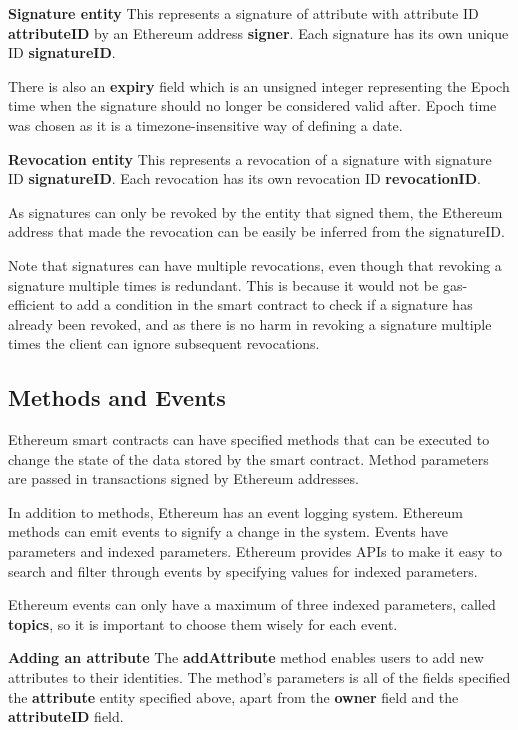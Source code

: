 \documentclass[12pt,a4paper]{report}
\begin{document}
	\bigskip
	\noindent \textbf{Signature entity}\newline
	This represents a signature of attribute with attribute ID \textbf{attributeID} by an Ethereum address \textbf{signer}. Each signature has its own unique ID \textbf{signatureID}.
	
	There is also an \textbf{expiry} field which is an unsigned integer representing the Epoch time when the signature should no longer be considered valid after. Epoch time was chosen as it is a timezone-insensitive way of defining a date.
	
	\bigskip
	\noindent \textbf{Revocation entity}\newline
	This represents a revocation of a signature with signature ID \textbf{signatureID}. Each revocation has its own revocation ID \textbf{revocationID}.
	
	As signatures can only be revoked by the entity that signed them, the Ethereum address that made the revocation can be easily be inferred from the signatureID.
	
	Note that signatures can have multiple revocations, even though that revoking a signature multiple times is redundant. This is because it would not be gas-efficient to add a condition in the smart contract to check if a signature has already been revoked, and as there is no harm in revoking a signature multiple times the client can ignore subsequent revocations.
	
	\subsection{Methods and Events}
	Ethereum smart contracts can have specified methods that can be executed to change the state of the data stored by the smart contract. Method parameters are passed in transactions signed by Ethereum addresses.
	
	In addition to methods, Ethereum has an event logging system. Ethereum methods can emit events to signify a change in the system. Events have parameters and indexed parameters. Ethereum provides APIs to make it easy to search and filter through events by specifying values for indexed parameters.
	
	Ethereum events can only have a maximum of three indexed parameters, called \textbf{topics}, so it is important to choose them wisely for each event.\cite{14}
	
	\bigskip
	\noindent \textbf{Adding an attribute}\newline
	The \textbf{addAttribute} method enables users to add new attributes to their identities. The method's parameters is all of the fields specified the \textbf{attribute} entity specified above, apart from the \textbf{owner} field and the \textbf{attributeID} field.
	
\end{document}

